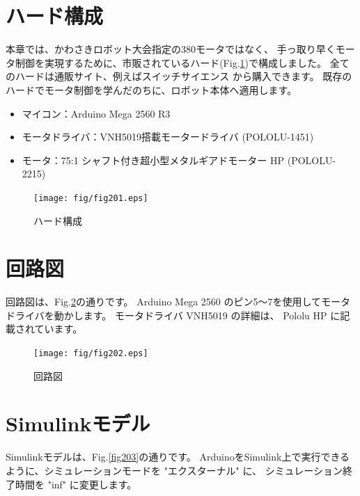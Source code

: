 \section{ハード構成}\label{dux30d7ux30eaux30f3ux30bfux306eux57faux672cux539fux7406}

本章では、かわさきロボット大会指定の380モータではなく、
手っ取り早くモータ制御を実現するために、市販されているハード(Fig.\ref{fig201})で構成しました。
全てのハードは通販サイト、例えばスイッチサイエンス \cite{switch-science_HP} から購入できます。
既存のハードでモータ制御を学んだのちに、ロボット本体へ適用します。

\begin{itemize}
    \tightlist
    \item
    マイコン：Arduino Mega 2560 R3
    \item
    モータドライバ：VNH5019搭載モータードライバ (POLOLU-1451)
    \item
    モータ：75:1 シャフト付き超小型メタルギアドモーター HP (POLOLU-2215)
    \end{itemize}

\begin{figure}[htbp]
\centering
\texttt{[image: fig/fig201.eps]}
\caption{ハード構成}
\label{fig201}
\end{figure}


\section{回路図}\label{ux71b1ux6eb6ux89e3ux7a4dux5c64ux6cd5fdm}

回路図は、Fig.\ref{fig202}の通りです。
Arduino Mega 2560 のピン5～7を使用してモータドライバを動かします。
モータドライバ VNH5019 の詳細は、
Pololu HP \cite{pololu_HP_driver} に記載されています。

\begin{figure}[htbp]
\centering
\texttt{[image: fig/fig202.eps]}
\caption{回路図}
\label{fig202}
\end{figure}


\section{Simulinkモデル}\label{ux71b1ux6eb6ux89e3ux7a4dux5c64ux65b9ux6cd5ux306eux7279ux5fb4}

Simulinkモデルは、Fig.\ref{fig203}の通りです。
ArduinoをSimulink上で実行できるように、シミュレーションモードを "エクスターナル" に、
シミュレーション終了時間を "inf" に変更します。

